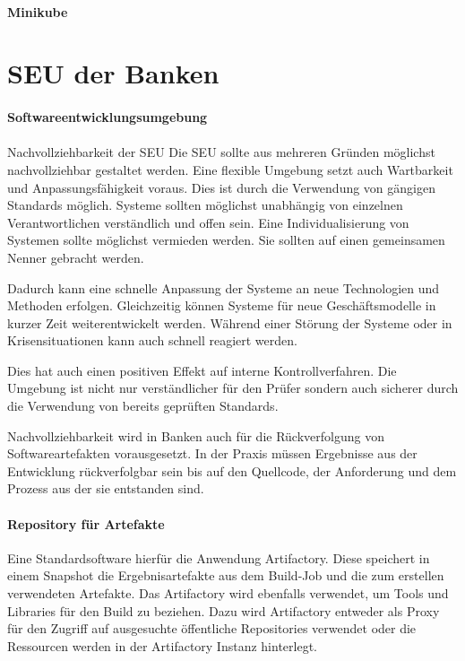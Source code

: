 \paragraph{Minikube}
%
%
%
%
\section{SEU der Banken}

\paragraph{Softwareentwicklungsumgebung}

\paragraph{}{Nachvollziehbarkeit der SEU}
Die \ac{SEU} sollte aus mehreren Gründen möglichst nachvollziehbar gestaltet werden. Eine flexible Umgebung setzt auch Wartbarkeit und Anpassungsfähigkeit voraus. Dies ist durch die Verwendung von gängigen Standards möglich. Systeme sollten möglichst unabhängig von einzelnen Verantwortlichen verständlich und offen sein. Eine Individualisierung von Systemen sollte möglichst vermieden werden. Sie sollten auf einen gemeinsamen Nenner gebracht werden.

Dadurch kann eine schnelle Anpassung der Systeme an neue Technologien und Methoden erfolgen. Gleichzeitig können Systeme für neue Geschäftsmodelle in kurzer Zeit weiterentwickelt werden. Während einer Störung der Systeme oder in Krisensituationen kann auch schnell reagiert werden.

Dies hat auch einen positiven Effekt auf interne Kontrollverfahren. Die Umgebung ist nicht nur verständlicher für den Prüfer sondern auch sicherer durch die Verwendung von bereits geprüften Standards.

Nachvollziehbarkeit wird in Banken auch für die Rückverfolgung von Softwareartefakten vorausgesetzt. In der Praxis müssen Ergebnisse aus der Entwicklung rückverfolgbar sein bis auf den Quellcode, der Anforderung und dem Prozess aus der sie entstanden sind.

\paragraph{Repository für Artefakte}
Eine Standardsoftware hierfür die Anwendung Artifactory. Diese speichert in einem Snapshot die Ergebnisartefakte aus dem Build-Job und die zum erstellen verwendeten Artefakte. Das Artifactory wird ebenfalls verwendet, um Tools und Libraries für den Build zu beziehen. Dazu wird Artifactory entweder als Proxy für den Zugriff auf ausgesuchte öffentliche Repositories verwendet oder die Ressourcen werden in der Artifactory Instanz hinterlegt.

